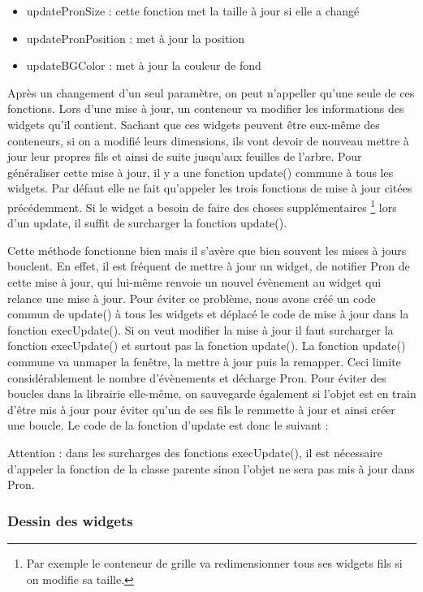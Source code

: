 \begin{itemize}
  \item updatePronSize : cette fonction met la taille à jour si elle a changé
  \item updatePronPosition : met à jour la position
  \item updateBGColor : met à jour la couleur de fond
\end{itemize}

Après un changement d'un seul paramètre, on peut n'appeller qu'une seule de ces fonctions.
Lors d'une mise à jour, un conteneur va modifier les informations des widgets qu'il contient.
Sachant que ces widgets peuvent être eux-même des conteneurs, si on a modifié leurs dimensions, ils vont devoir de nouveau mettre à jour leur propres fils et ainsi de suite jusqu'aux feuilles de l'arbre.
Pour généraliser cette mise à jour, il y a une fonction update() commune à tous les widgets.
Par défaut elle ne fait qu'appeler les trois fonctions de mise à jour citées précédemment.
Si le widget a besoin de faire des choses supplémentaires
\footnote{Par exemple le conteneur de grille va redimensionner tous ses widgets fils si on modifie sa taille.}
lors d'un update, il suffit de surcharger la fonction update().

Cette méthode fonctionne bien mais il s'avère que bien souvent les mises à jours bouclent.
En effet, il est fréquent de mettre à jour un widget, de notifier Pron de cette mise à jour, qui lui-même renvoie un nouvel évènement au widget qui relance une mise à jour.
Pour éviter ce problème, nous avons créé un code commun de update() à tous les widgets et déplacé le code de mise à jour dans la fonction execUpdate().
Si on veut modifier la mise à jour il faut surcharger la fonction execUpdate() et surtout pas la fonction update().
La fonction update() commune va unmaper la fenêtre, la mettre à jour puis la remapper. Ceci limite considérablement le nombre d'évènements et décharge Pron.
Pour éviter des boucles dans la librairie elle-même, on sauvegarde également si l'objet est en train d'être mis à jour pour éviter qu'un de ses fils le remmette à jour et ainsi créer une boucle.
Le code de la fonction d'update est donc le suivant :



Attention : dans les surcharges des fonctions execUpdate(), il est nécessaire d'appeler la fonction de la classe parente sinon l'objet ne sera pas mis à jour dans Pron.

\subsubsection{Dessin des widgets}

